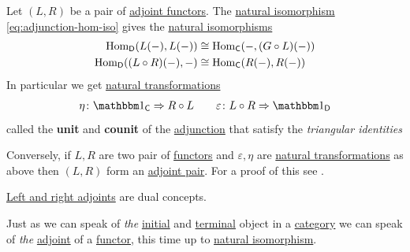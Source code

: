 \documentclass[../../main]{subfiles}
\begin{document}
\begin{remark}\label{def:unit-counit}
  Let \((L, R)\) be a pair of \hyperref[def:adjoint-functors]{adjoint functors}.
  The \hyperref[def:natural-transformation]{natural isomorphism} \eqref{eq:adjunction-hom-iso} gives the \hyperref[def:natural-transformation]{natural isomorphisms}
  \begin{align*}
    \operatorname{Hom}_{\mathsf{D}}(L(-), L(-)) &\cong \operatorname{Hom}_{\mathsf{C}}(-, (G \circ L)(-)) \\
    \operatorname{Hom}_{\mathsf{D}}((L \circ R)(-), -) &\cong \operatorname{Hom}_{\mathsf{C}}(R(-), R(-))
  \end{align*}
  In particular we get \hyperref[def:natural-transformation]{natural transformations}
  \begin{align*}
    \eta\colon \id_{\category{C}} \Rightarrow R \circ L \qquad \varepsilon\colon L \circ R \Rightarrow \id_{\category{D}}
  \end{align*}
  called the \textbf{unit} and \textbf{counit} of the \hyperref[def:adjoint-functors]{adjunction} that satisfy the \textit{triangular identities}
  \begin{center}
  \end{center}
  
  Conversely, if \(L, R\) are two pair of \hyperref[def:functor]{functors} and \(\varepsilon, \eta\) are \hyperref[def:natural-transformation]{natural transformations} as above then \((L, R)\) form an \hyperref[def:adjoint-functors]{adjoint pair}.
  For a proof of this see \cite[Proposition 4.2.6]{riehlCategoryTheoryContext}.
\end{remark}

\begin{remark}
  \hyperref[def:adjoint-functors]{Left and right adjoints} are dual concepts.
\end{remark}

Just as we can speak of \textit{the} \hyperref[def:initial-terminal-object]{initial} and \hyperref[def:initial-terminal-object]{terminal} object in a \hyperref[def:category]{category} we can speak of \textit{the} \hyperref[def:adjoint-functors]{adjoint} of a \hyperref[def:functor]{functor}, this time up to \hyperref[def:natural-transformation]{natural isomorphism}.
\end{document}

